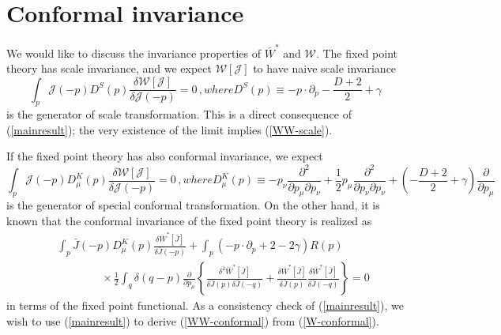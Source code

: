 \documentclass[aps,prd,preprint,groupedaddress,preprintnumbers,longbibliography]{revtex4-1}
\newcommand{\nn}{\nonumber}
\newcommand{\lb}{\left\lbrace}
\newcommand{\rb}{\right\rbrace}
\newcommand{\WW}{\mathcal{W}}
\newcommand{\JJ}{\mathcal{J}}
\begin{document}
\section{Conformal invariance\label{section-invariance}}

We would like to discuss the invariance properties of $\bar{W}^*$ and $\WW$.
The fixed point theory has scale invariance, and we expect $\WW [\JJ]$
to have naive scale invariance
\begin{subequations}
\label{WW-scale}
\begin{equation}
\int_p \JJ (-p) D^S (p) \frac{\delta \WW [\JJ ]}{\delta \JJ (-p)}
= 0\,,
\end{equation}
where
\begin{equation}
D^S (p) \equiv - p \cdot \partial_p - \frac{D+2}{2} + \gamma
\end{equation}
\end{subequations}
is the generator of scale transformation.  This is a direct
consequence of (\ref{mainresult}); the very existence of the limit
implies (\ref{WW-scale}).

If the fixed point theory has also conformal invariance, we
expect
\begin{subequations}
\label{WW-conformal-DK}
\begin{equation}
\int_p \JJ (-p) D^K_\mu (p) \frac{\delta \WW [\JJ ]}{\delta \JJ (-p)}
= 0\,,\label{WW-conformal}
\end{equation}
where
\begin{equation}
D^K_\mu (p) \equiv - p_\nu \frac{\partial^2}{\partial p_\mu \partial
  p_\nu} + \frac{1}{2} p_\mu \frac{\partial^2}{\partial p_\nu \partial
  p_\nu} + \left(- \frac{D+2}{2} + \gamma \right)
\frac{\partial}{\partial p_\mu}\label{WW-DK}
\end{equation}
\end{subequations}
is the generator of special conformal transformation.  On the other
hand, it is known \cite{Rosten:2014oja, Delamotte:2015aaa,
  Rosten:2016nmc, Rosten:2016zap, Sonoda:2017zgl, Rosten:2017urs} that
the conformal invariance of the fixed point theory is realized as
\begin{eqnarray}
  &&\int_p \bar{J} (-p) D_\mu^K (p) \frac{\delta \bar{W}^* [\bar{J}]}{\delta
    \bar{J} (-p)}
  + \int_p \left( - p \cdot \partial_p + 2 - 2 \gamma \right) R
  (p) \nn\\
  &&\qquad\qquad \times \frac{1}{2} \int_q \delta (q-p) \frac{\partial}{\partial
    p_\mu} \lb \frac{\delta^2 \bar{W}^* [\bar{J}]}{\delta \bar{J}(p) \delta
    \bar{J} (-q)} + \frac{\delta \bar{W}^* [\bar{J}]}{\delta \bar{J}(p)}
  \frac{\delta \bar{W}^* [\bar{J}]}{\delta \bar{J}(-q)} \rb =
  0\,\label{W-conformal} 
\end{eqnarray}
in terms of the fixed point functional.  As a consistency check of
(\ref{mainresult}), we wish to use (\ref{mainresult}) to derive
(\ref{WW-conformal}) from (\ref{W-conformal}).
\end{document}
